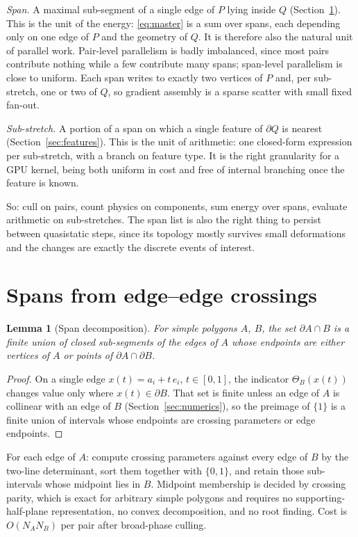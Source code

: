 \documentclass[11pt]{article}
\newtheorem{lemma}{Lemma}
\begin{document}
\emph{Span.} A maximal sub-segment of a single edge of $P$ lying inside $Q$ (Section~\ref{sec:spans}). This is the unit of the energy: \eqref{eq:master} is a sum over spans, each depending only on one edge of $P$ and the geometry of $Q$. It is therefore also the natural unit of parallel work. Pair-level parallelism is badly imbalanced, since most pairs contribute nothing while a few contribute many spans; span-level parallelism is close to uniform. Each span writes to exactly two vertices of $P$ and, per sub-stretch, one or two of $Q$, so gradient assembly is a sparse scatter with small fixed fan-out.

\emph{Sub-stretch.} A portion of a span on which a single feature of $\partial Q$ is nearest (Section~\ref{sec:features}). This is the unit of arithmetic: one closed-form expression per sub-stretch, with a branch on feature type. It is the right granularity for a GPU kernel, being both uniform in cost and free of internal branching once the feature is known.

So: cull on pairs, count physics on components, sum energy over spans, evaluate arithmetic on sub-stretches. The span list is also the right thing to persist between quasistatic steps, since its topology mostly survives small deformations and the changes are exactly the discrete events of interest.

\section{Spans from edge--edge crossings}
\label{sec:spans}

\begin{lemma}[Span decomposition]
\label{lem:spans}
For simple polygons $A$, $B$, the set $\partial A\cap B$ is a finite union of closed sub-segments of the edges of $A$ whose endpoints are either vertices of $A$ or points of $\partial A\cap\partial B$.
\end{lemma}

\begin{proof}
On a single edge $x(t) = a_i + t\,e_i$, $t\in[0,1]$, the indicator $\Theta_B(x(t))$ changes value only where $x(t)\in\partial B$. That set is finite unless an edge of $A$ is collinear with an edge of $B$ (Section~\ref{sec:numerics}), so the preimage of $\{1\}$ is a finite union of intervals whose endpoints are crossing parameters or edge endpoints.
\end{proof}

For each edge of $A$: compute crossing parameters against every edge of $B$ by the two-line determinant, sort them together with $\{0,1\}$, and retain those sub-intervals whose midpoint lies in $B$. Midpoint membership is decided by crossing parity, which is exact for arbitrary simple polygons and requires no supporting-half-plane representation, no convex decomposition, and no root finding. Cost is $O(N_AN_B)$ per pair after broad-phase culling.
\end{document}
